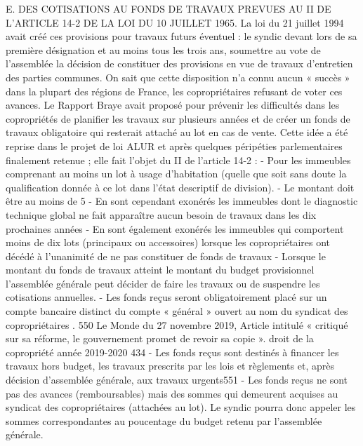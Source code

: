 E. DES COTISATIONS AU FONDS DE TRAVAUX PREVUES AU II DE L’ARTICLE 14-2 DE LA LOI DU 10 JUILLET 1965.
La loi du 21 juillet 1994 avait créé ces provisions pour travaux futurs éventuel : le syndic devant lors de sa première désignation et au moins tous les trois ans, soumettre au vote de l'assemblée la décision de constituer des provisions en vue de travaux d'entretien des parties communes.
On sait que cette disposition n’a connu aucun « succès » dans la plupart des régions de France, les copropriétaires refusant de voter ces avances.
Le Rapport Braye avait proposé pour prévenir les difficultés dans les copropriétés de planifier les travaux sur plusieurs années et de créer un fonds de travaux obligatoire qui resterait attaché au lot en cas de vente. Cette idée a été reprise dans le projet de loi ALUR et après quelques péripéties parlementaires finalement retenue ; elle fait l’objet du II de l’article 14-2 :
- Pour les immeubles comprenant au moins un lot à usage d’habitation (quelle que soit sans doute la qualification donnée à ce lot dans l’état descriptif de division).
- Le montant doit être au moins de 5 %
- En sont cependant exonérés les immeubles dont le diagnostic technique global ne fait apparaître aucun besoin de travaux dans les dix prochaines années
- En sont également exonérés les immeubles qui comportent moins de dix lots (principaux ou accessoires) lorsque les copropriétaires ont décédé à l’unanimité de ne pas constituer de fonds de travaux
- Lorsque le montant du fonds de travaux atteint le montant du budget provisionnel l’assemblée générale peut décider de faire les travaux ou de suspendre les cotisations annuelles.
- Les fonds reçus seront obligatoirement placé sur un compte bancaire distinct du compte « général » ouvert au nom du syndicat des copropriétaires .
550 Le Monde du 27 novembre 2019, Article intitulé « critiqué sur sa réforme, le gouvernement promet de revoir sa copie ».
droit de la copropriété année 2019-2020
434
- Les fonds reçus sont destinés à financer les travaux hors budget, les travaux prescrits par les lois et règlements et, après décision d’assemblée générale, aux travaux urgents551
- Les fonds reçus ne sont pas des avances (remboursables) mais des sommes qui demeurent acquises au syndicat des copropriétaires (attachées au lot).
Le syndic pourra donc appeler les sommes correspondantes au poucentage du budget retenu par l’assemblée générale.
